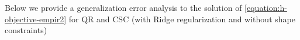 Below we provide a generalization error analysis to the solution of \cref{equation:h-objective-empir2} for
\ac{QR} and \ac{CSC} (with Ridge regularization and without shape constraints)
